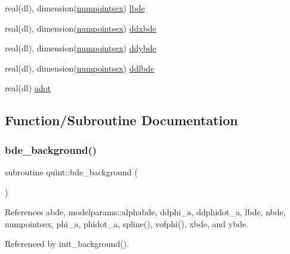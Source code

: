 \begin{DoxyCompactItemize}
\item 
real(dl), dimension(\mbox{\hyperlink{namespacequint_a8388814d2fb6e0f54431a7257a8f86a9}{numpointsex}}) \mbox{\hyperlink{namespacequint_aea928c2d627a7d5001dfe09a898d0c21}{lbde}}
\item 
real(dl), dimension(\mbox{\hyperlink{namespacequint_a8388814d2fb6e0f54431a7257a8f86a9}{numpointsex}}) \mbox{\hyperlink{namespacequint_adc4851c280622a1d594cbcc28e15aba1}{ddxbde}}
\item 
real(dl), dimension(\mbox{\hyperlink{namespacequint_a8388814d2fb6e0f54431a7257a8f86a9}{numpointsex}}) \mbox{\hyperlink{namespacequint_a10a79a1d7070650f6f67d1de7fa4b34a}{ddybde}}
\item 
real(dl), dimension(\mbox{\hyperlink{namespacequint_a8388814d2fb6e0f54431a7257a8f86a9}{numpointsex}}) \mbox{\hyperlink{namespacequint_a64e99c9feaf4cb920180f5be428745a6}{ddlbde}}
\item 
real(dl) \mbox{\hyperlink{namespacequint_a0574a45f7095364017aa3ff788ea374a}{adot}}
\end{DoxyCompactItemize}


\subsection{Function/\+Subroutine Documentation}
\mbox{\label{namespacequint_a6a96dda084f9c9c3188eaa2576b9bfe2}} 
\subsubsection{\texorpdfstring{bde\+\_\+background()}{bde\_background()}}
{\footnotesize\ttfamily subroutine quint\+::bde\+\_\+background (\begin{DoxyParamCaption}{ }\end{DoxyParamCaption})}



References abde, modelparams\+::alphabde, ddphi\+\_\+a, ddphidot\+\_\+a, lbde, nbde, numpointsex, phi\+\_\+a, phidot\+\_\+a, spline(), vofphi(), xbde, and ybde.



Referenced by init\+\_\+background().

